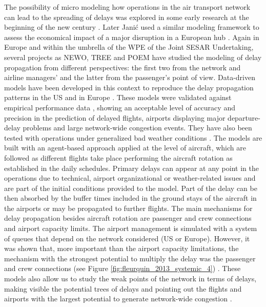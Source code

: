 The possibility of micro modeling how operations in the air transport network can lead to the spreading of delays was explored in some early research at the beginning of the new century \cite{schaefer_2001_flight,rosenberg_2002_stochastic}. Later Jani\'c used a similar modeling framework to assess the economical impact of a major disruption in a European hub \cite{janic_2005_modeling}. Again in Europe and within the umbrella of the WPE of the Joint SESAR Undertaking, several projects as NEWO, TREE  and POEM have studied the modeling of delay propagation from different perspectives: the first two from the network and airline managers' and the latter from the passenger's point of view. 
%
Data-driven models have been developed in this context to reproduce the delay propagation patterns in the US \cite{fleurquin_2013_systemic,pyrgiotis_2013_modelling} and in Europe \cite{campanelli_2015_tree}. These models were validated against empirical performance data \cite{fleurquin_2013_systemic,campanelli_2015_modelling}, showing an acceptable level of accuracy and precision in the prediction of delayed flights, airports displaying major departure-delay problems and large network-wide congestion events. They have also been tested with operations under generalized bad weather conditions \cite{fleurquin_2013_systemic}. 
%
The models are built with an agent-based approach applied at the level of aircraft, which are followed as different flights take place performing the aircraft rotation as established in the daily schedules. Primary delays can appear at any point in the operations due to technical, airport organizational or weather-related issues and are part of the initial conditions provided to the model. Part of the delay can be then absorbed by the buffer times included in the ground stays of the aircraft in the airports or may be propagated to further flights. 
%
The main mechanisms for delay propagation besides aircraft rotation are passenger and crew connections and airport capacity limits. The airport management is simulated with a system of queues that depend on the network considered (US or Europe). However, it was shown that, more important than the airport capacity limitations, the mechanism with the strongest potential to multiply the delay was the passenger and crew connections (see Figure \ref{fig:fleurquin_2013_systemic_4}) \cite{fleurquin_2013_systemic}. These models also allow us to study the weak points of the network in terms of delays, making visible the potential trees of delays and pointing out the flights and airports with the largest potential to generate network-wide congestion \cite{fleurquin_2014_trees}.  

